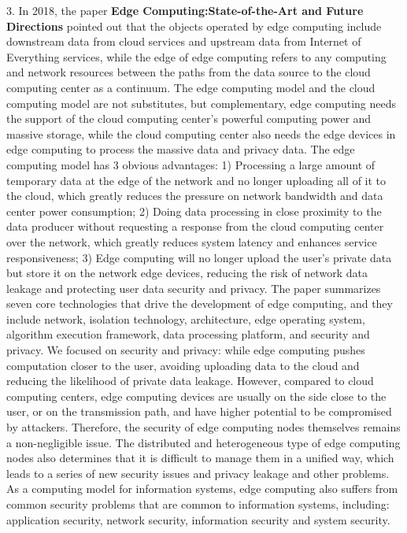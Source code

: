 \documentclass[a4paper,twoside]{scrbook}
\begin{document}
\begin{CJK}{UTF8}{gbsn}
3. In 2018, the paper \textbf{Edge Computing:State-of-the-Art and Future Directions}\cite{JFYZ201901009} pointed out that the objects operated by edge computing include downstream data from cloud services and upstream data from Internet of Everything services, while the edge of edge computing refers to any computing and network resources between the paths from the data source to the cloud computing center as a continuum. The edge computing model and the cloud computing model are not substitutes, but complementary, edge computing needs the support of the cloud computing center's powerful computing power and massive storage, while the cloud computing center also needs the edge devices in edge computing to process the massive data and privacy data.
The edge computing model has 3 obvious advantages:
1) Processing a large amount of temporary data at the edge of the network and no longer uploading all of it to the cloud, which greatly reduces the pressure on network bandwidth and data center power consumption;
2) Doing data processing in close proximity to the data producer without requesting a response from the cloud computing center over the network, which greatly reduces system latency and enhances service responsiveness;
3) Edge computing will no longer upload the user's private data but store it on the network edge devices, reducing the risk of network data leakage and protecting user data security and privacy.
The paper summarizes seven core technologies that drive the development of edge computing, and they include network, isolation technology, architecture, edge operating system, algorithm execution framework, data processing platform, and security and privacy. We focused on security and privacy: while edge computing pushes computation closer to the user, avoiding uploading data to the cloud and reducing the likelihood of private data leakage. However, compared to cloud computing centers, edge computing devices are usually on the side close to the user, or on the transmission path, and have higher potential to be compromised by attackers. Therefore, the security of edge computing nodes themselves remains a non-negligible issue. The distributed and heterogeneous type of edge computing nodes also determines that it is difficult to manage them in a unified way, which leads to a series of new security issues and privacy leakage and other problems. As a computing model for information systems, edge computing also suffers from common security problems that are common to information systems, including: application security, network security, information security and system security.

\end{CJK}
\end{document}
